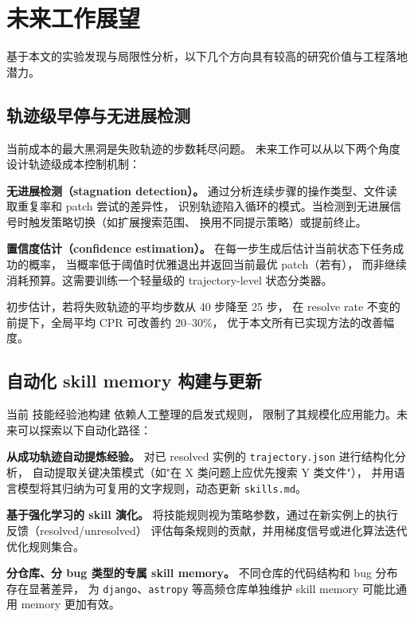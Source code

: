 \section{未来工作展望}
\label{sec:future-work}

基于本文的实验发现与局限性分析，以下几个方向具有较高的研究价值与工程落地潜力。

\subsection{轨迹级早停与无进展检测}
\label{subsec:future-earlystop}

当前成本的最大黑洞是失败轨迹的步数耗尽问题。
未来工作可以从以下两个角度设计轨迹级成本控制机制：

\textbf{无进展检测（stagnation detection）。}
通过分析连续步骤的操作类型、文件读取重复率和 patch 尝试的差异性，
识别轨迹陷入循环的模式。当检测到无进展信号时触发策略切换（如扩展搜索范围、
换用不同提示策略）或提前终止。

\textbf{置信度估计（confidence estimation）。}
在每一步生成后估计当前状态下任务成功的概率，
当概率低于阈值时优雅退出并返回当前最优 patch（若有），
而非继续消耗预算。这需要训练一个轻量级的 trajectory-level 状态分类器。

初步估计，若将失败轨迹的平均步数从 40 步降至 25 步，
在 resolve rate 不变的前提下，全局平均 CPR 可改善约 20--30\%，
优于本文所有已实现方法的改善幅度。

\subsection{自动化 skill memory 构建与更新}
\label{subsec:future-skill-memory}

当前 技能经验池构建 依赖人工整理的启发式规则，
限制了其规模化应用能力。未来可以探索以下自动化路径：

\textbf{从成功轨迹自动提炼经验。}
对已 resolved 实例的 \texttt{trajectory.json} 进行结构化分析，
自动提取关键决策模式（如"在 X 类问题上应优先搜索 Y 类文件"），
并用语言模型将其归纳为可复用的文字规则，动态更新 \texttt{skills.md}。

\textbf{基于强化学习的 skill 演化。}
将技能规则视为策略参数，通过在新实例上的执行反馈（resolved/unresolved）
评估每条规则的贡献，并用梯度信号或进化算法迭代优化规则集合。

\textbf{分仓库、分 bug 类型的专属 skill memory。}
不同仓库的代码结构和 bug 分布存在显著差异，
为 \texttt{django}、\texttt{astropy} 等高频仓库单独维护 skill memory
可能比通用 memory 更加有效。

